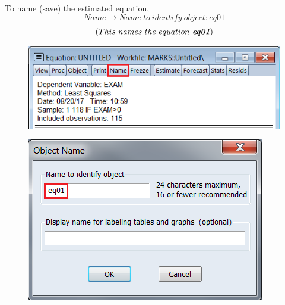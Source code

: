 \documentclass[12pt]{report}
\begin{document}
\vspace{-\baselineskip}
\noindent To name (save) the estimated equation,
$$Name \to Name\ to\ identify\ object: eq01$$
$$(This\ names\ the\ equation\ \textit{\textbf{eq01}})$$
\begin{figure}[H]
	\centering
	\includegraphics{q1_8}
\end{figure}
\vspace{-\baselineskip}
\begin{figure}[H]
	\centering
	\includegraphics{q1_9}
\end{figure}
\vspace{-\baselineskip}
\end{document}
